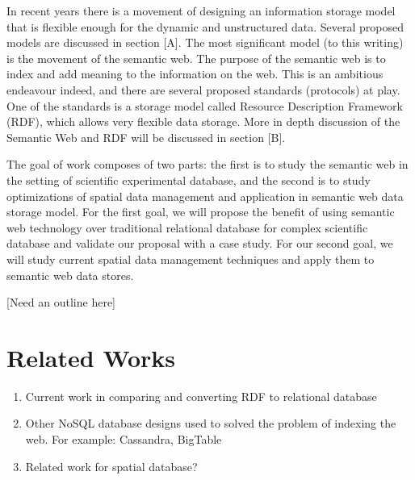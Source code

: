 In recent years there is a movement of designing an information storage model that is flexible enough for the dynamic and unstructured data. Several proposed models are discussed in section [A]. The most significant model (to this writing) is the movement of the semantic web. The purpose of the semantic web is to index and add meaning to the information on the web. This is an ambitious endeavour indeed, and there are several proposed standards (protocols) at play. One of the standards is a storage model called Resource Description Framework (RDF), which allows very flexible data storage. More in depth discussion of the Semantic Web and RDF will be discussed in section [B].

The goal of work composes of two parts: the first is to study the semantic web in the setting of scientific experimental database, and the second is to study optimizations of spatial data management and application in semantic web data storage model. For the first goal, we will propose the benefit of using semantic web technology over traditional relational database for complex scientific database and validate our proposal with a case study. For our second goal, we will study current spatial data management techniques and apply them to semantic web data stores.

[Need an outline here]

\section{Related Works}

\begin{enumerate}
  \item Current work in comparing and converting RDF to relational database
  \item Other NoSQL database designs used to solved the problem of indexing the web. For example: Cassandra, BigTable
  \item Related work for spatial database?
\end{enumerate}
